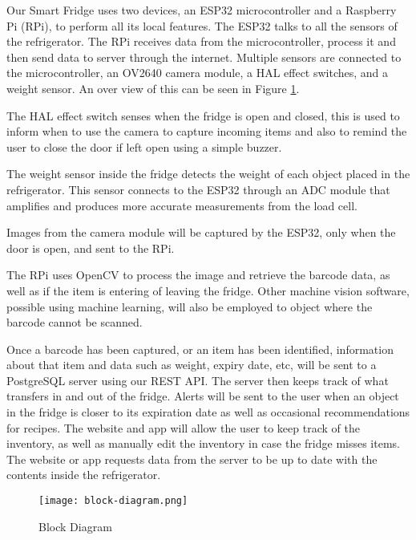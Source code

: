 Our Smart Fridge uses two devices, an ESP32 microcontroller and a Raspberry Pi (RPi), to perform all its local features.
The ESP32 talks to all the sensors of the refrigerator.
The RPi receives data from the microcontroller, process it and then send data to server through the internet.
Multiple sensors are connected to the microcontroller, an OV2640 camera module, a HAL effect switches, and a weight sensor.
An over view of this can be seen in Figure \ref{fig:block_diagram}.

The HAL effect switch senses when the fridge is open and closed, 
this is used to inform when to use the camera to capture incoming items and also to remind the user to close the door if left open using a simple buzzer.

The weight sensor inside the fridge detects the weight of each object placed in the refrigerator.
This sensor connects to the ESP32 through an ADC module that amplifies and produces more accurate measurements from the load cell.

Images from the camera module will be captured by the ESP32, only when the door is open, and sent to the RPi.

The RPi uses OpenCV to process the image and retrieve the barcode data, as well as if the item is entering of leaving the fridge.
Other machine vision software, possible using machine learning, will also be employed to object where the barcode cannot be scanned.

Once a barcode has been captured, or an item has been identified, 
information about that item and data such as weight, expiry date, etc, will be sent to a PostgreSQL server using our REST API.
The server then keeps track of what transfers in and out of the fridge.
Alerts will be sent to the user when an object in the fridge is closer to its expiration date as well as occasional recommendations for recipes. 
The website and app will allow the user to keep track of the inventory,
as well as manually edit the inventory in case the fridge misses items.
The website or app requests data from the server to be up to date with the contents inside the refrigerator.

\begin{figure}[H]        
    \centering
    \texttt{[image: block-diagram.png]}
    \caption{Block Diagram}
    \label{fig:block_diagram}
\end{figure} 
